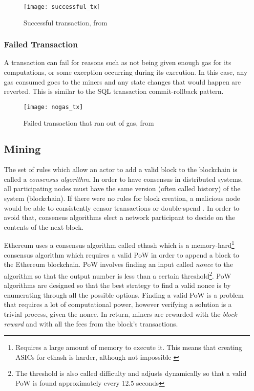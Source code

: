 \begin{figure}[H]
    \centering
    \texttt{[image: successful\_tx]}
    \caption{Successful transaction, from \cite{preethi}}
    \label{fig:successful_tx}
\end{figure}

\subsubsection{Failed Transaction}
A transaction can fail for reasons such as not being given enough gas for its computations, or some exception occurring during its execution. In this case, any gas consumed goes to the miners and any state changes that would happen are reverted. This is similar to the SQL transaction commit-rollback pattern.

\begin{figure}[H]
    \centering
    \texttt{[image: nogas\_tx]}
    \caption{Failed transaction that ran out of gas, from \cite{preethi}}
    \label{fig:nogas_tx}
\end{figure}

\subsection{Mining}
The set of rules which allow an actor to add a valid block to the blockchain is called a \textit{consensus algorithm}. In order to have consensus in distributed systems, all participating nodes must have the same version (often called history) of the system (blockchain). If there were no rules for block creation, a malicious node would be able to consistently censor transactions or double-spend \cite{doublespend}. In order to avoid that, consensus algorithms elect a network participant to decide on the contents of the next block. 

Ethereum uses a consensus algorithm called ethash\cite{ethash} which is a memory-hard\footnote{Requires a large amount of memory to execute it. This means that creating ASICs for ethash is harder, although not impossible \cite{asicfork}} consensus algorithm which requires a valid PoW in order to append a block to the Ethereum blockchain. PoW involves finding an input called \textit{nonce} to the algorithm so that the output number is less than a certain threshold\footnote{The threshold is also called difficulty and adjusts dynamically so that a valid PoW is found approximately every 12.5 seconds}. PoW algorithms are designed so that the best strategy to find a valid nonce is by enumerating through all the possible options. Finding a valid PoW is a problem that requires a lot of computational power, however verifying a solution is a trivial process, given the nonce. In return, miners are rewarded with the \textit{block reward} and with all the fees from the block's transactions.

